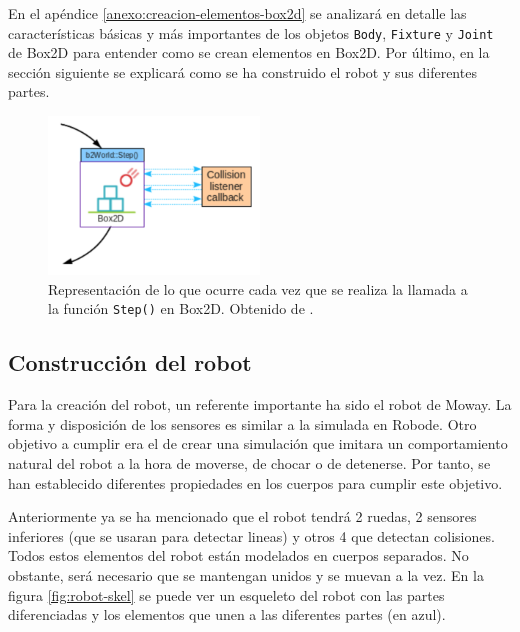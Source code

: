 En el apéndice \ref{anexo:creacion-elementos-box2d} se analizará en detalle las características básicas y más importantes de los objetos \texttt{Body}, \texttt{Fixture} y \texttt{Joint} de Box2D para entender como se crean elementos en Box2D. Por último, en la sección siguiente se explicará como se ha construido el robot y sus diferentes partes.


\begin{figure}[!ht]
	\begin{centering}
		\includegraphics[width=0.5\textwidth]{images/step-box2d.png}
			\caption{Representación de lo que ocurre cada vez que se realiza la llamada a la función \texttt{Step()} en Box2D. Obtenido de \cite{box2d}.}
				\label{fig:step-box2d}
	\end{centering}
\end{figure}


\subsection{Construcción del robot}
\label{sec:contruccion-robot}

Para la creación del robot, un referente importante ha sido el robot de Moway. La forma y disposición de los sensores es similar a la simulada en Robode. Otro objetivo a cumplir era el de crear una simulación que imitara un comportamiento natural del robot a la hora de moverse, de chocar o de detenerse. Por tanto, se han establecido diferentes propiedades en los cuerpos para cumplir este objetivo.

Anteriormente ya se ha mencionado que el robot tendrá 2 ruedas, 2 sensores inferiores (que se usaran para detectar lineas) y otros 4 que detectan colisiones. Todos estos elementos del robot están modelados en cuerpos separados. No obstante, será necesario que se mantengan unidos y se muevan a la vez. En la figura \ref{fig:robot-skel} se puede ver un esqueleto del robot con las partes diferenciadas y los elementos que unen a las diferentes partes (en azul).

